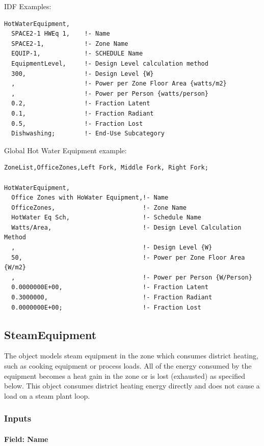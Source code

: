 IDF Examples:

\begin{lstlisting}
HotWaterEquipment,
  SPACE2-1 HWEq 1,    !- Name
  SPACE2-1,           !- Zone Name
  EQUIP-1,            !- SCHEDULE Name
  EquipmentLevel,     !- Design Level calculation method
  300,                !- Design Level {W}
  ,                   !- Power per Zone Floor Area {watts/m2}
  ,                   !- Power per Person {watts/person}
  0.2,                !- Fraction Latent
  0.1,                !- Fraction Radiant
  0.5,                !- Fraction Lost
  Dishwashing;        !- End-Use Subcategory
\end{lstlisting}

Global Hot Water Equipment example:

\begin{lstlisting}
ZoneList,OfficeZones,Left Fork, Middle Fork, Right Fork;

HotWaterEquipment,
  Office Zones with HoWater Equipment,!- Name
  OfficeZones,                        !- Zone Name
  HotWater Eq Sch,                    !- Schedule Name
  Watts/Area,                         !- Design Level Calculation Method
  ,                                   !- Design Level {W}
  50,                                 !- Power per Zone Floor Area {W/m2}
  ,                                   !- Power per Person {W/Person}
  0.0000000E+00,                      !- Fraction Latent
  0.3000000,                          !- Fraction Radiant
  0.0000000E+00;                      !- Fraction Lost
\end{lstlisting}

\subsection{SteamEquipment}\label{steamequipment}

The object models steam equipment in the zone which consumes district heating, such as cooking equipment or process loads. All of the energy consumed by the equipment becomes a heat gain in the zone or is lost (exhausted) as specified below. This object consumes district heating energy directly and does not cause a load on a steam plant loop.

\subsubsection{Inputs}\label{inputs-6-012}

\paragraph{Field: Name}\label{field-name-6-009}

